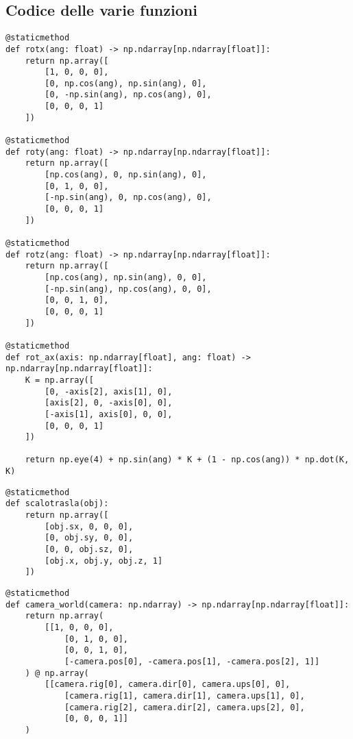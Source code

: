 \documentclass{article}
\begin{document}
\newpage

\subsection{Codice delle varie funzioni}
\begin{lstlisting}[style=Pythonstyle, caption={Matrici di Rotazione (3 con assi globali, 1 con asse custom)}]
@staticmethod
def rotx(ang: float) -> np.ndarray[np.ndarray[float]]:
	return np.array([
		[1, 0, 0, 0],
		[0, np.cos(ang), np.sin(ang), 0],
		[0, -np.sin(ang), np.cos(ang), 0],
		[0, 0, 0, 1]
	])

@staticmethod
def roty(ang: float) -> np.ndarray[np.ndarray[float]]:
	return np.array([
		[np.cos(ang), 0, np.sin(ang), 0],
		[0, 1, 0, 0],
		[-np.sin(ang), 0, np.cos(ang), 0],
		[0, 0, 0, 1]
	])

@staticmethod
def rotz(ang: float) -> np.ndarray[np.ndarray[float]]:
	return np.array([
		[np.cos(ang), np.sin(ang), 0, 0],
		[-np.sin(ang), np.cos(ang), 0, 0],
		[0, 0, 1, 0],
		[0, 0, 0, 1]
	])
	
@staticmethod
def rot_ax(axis: np.ndarray[float], ang: float) -> np.ndarray[np.ndarray[float]]:
	K = np.array([
		[0, -axis[2], axis[1], 0],
		[axis[2], 0, -axis[0], 0],
		[-axis[1], axis[0], 0, 0],
		[0, 0, 0, 1]
	])

	return np.eye(4) + np.sin(ang) * K + (1 - np.cos(ang)) * np.dot(K, K)
\end{lstlisting}

\begin{lstlisting}[style=Pythonstyle, caption={Matrice di ScaloTraslazione}]
@staticmethod
def scalotrasla(obj):
	return np.array([
		[obj.sx, 0, 0, 0],
		[0, obj.sy, 0, 0],
		[0, 0, obj.sz, 0],
		[obj.x, obj.y, obj.z, 1]
	])
\end{lstlisting}

\newpage

\begin{lstlisting}[style=Pythonstyle, caption={Matrice di cambio sistema di riferimento (camera)}]
@staticmethod
def camera_world(camera: np.ndarray) -> np.ndarray[np.ndarray[float]]:
	return np.array(
		[[1, 0, 0, 0],
			[0, 1, 0, 0],
			[0, 0, 1, 0],
			[-camera.pos[0], -camera.pos[1], -camera.pos[2], 1]]
	) @ np.array(
		[[camera.rig[0], camera.dir[0], camera.ups[0], 0],
			[camera.rig[1], camera.dir[1], camera.ups[1], 0],
			[camera.rig[2], camera.dir[2], camera.ups[2], 0],
			[0, 0, 0, 1]]
	)
\end{lstlisting}
\end{document}
